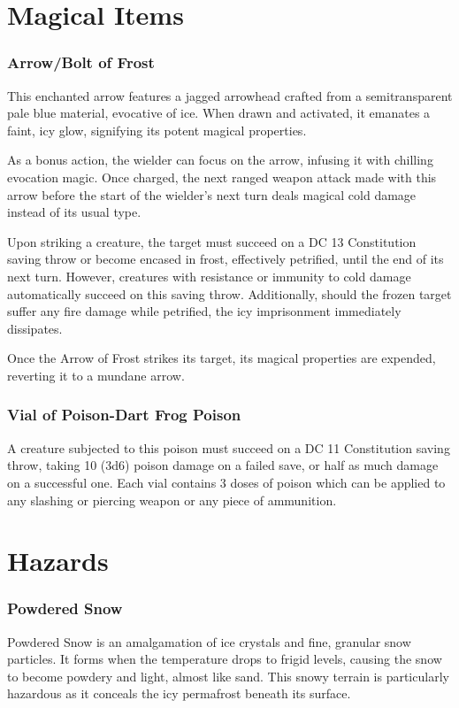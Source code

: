 \DungeonSheetGeometry

\chapter{Magical Items}
\subsection*{Arrow/Bolt of Frost}
\label{sec:ArrowBoltOfFrost}
This enchanted arrow features a jagged arrowhead crafted from a semitransparent pale blue material, evocative of ice. When drawn and activated, it emanates a faint, icy glow, signifying its potent magical properties.

As a bonus action, the wielder can focus on the arrow, infusing it with chilling evocation magic. Once charged, the next ranged weapon attack made with this arrow before the start of the wielder's next turn deals magical cold damage instead of its usual type.

Upon striking a creature, the target must succeed on a DC 13 Constitution saving throw or become encased in frost, effectively petrified, until the end of its next turn. However, creatures with resistance or immunity to cold damage automatically succeed on this saving throw. Additionally, should the frozen target suffer any fire damage while petrified, the icy imprisonment immediately dissipates.

Once the Arrow of Frost strikes its target, its magical properties are expended, reverting it to a mundane arrow.

\subsection*{Vial of Poison-Dart Frog Poison}
\label{sec:VialOfPoison-DartFrogPoison}
A creature subjected to this poison must succeed on a DC 11 Constitution saving throw, taking 10 (3d6) poison damage on a failed save, or half as much damage on a successful one. Each vial contains 3 doses of poison which can be applied to any slashing or piercing weapon or any piece of ammunition.


\chapter{Hazards}
\subsection*{Powdered Snow}
\label{sec:PowderedSnow}
Powdered Snow is an amalgamation of ice crystals and fine, granular snow particles. It forms when the temperature drops to frigid levels, causing the snow to become powdery and light, almost like sand. This snowy terrain is particularly hazardous as it conceals the icy permafrost beneath its surface.

